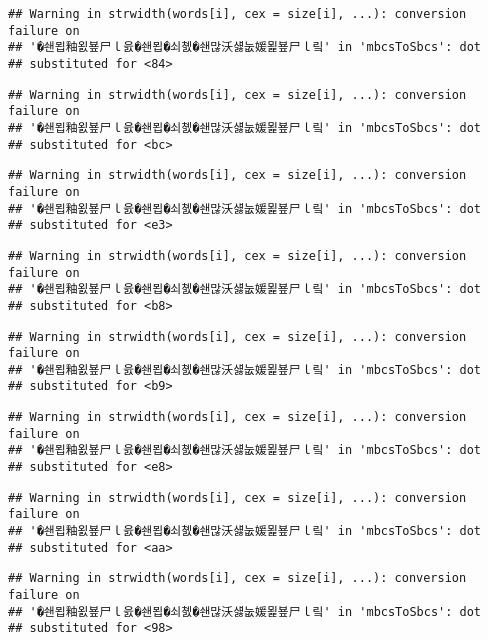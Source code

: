 \documentclass[]{article}
\begin{document}
\begin{verbatim}
## Warning in strwidth(words[i], cex = size[i], ...): conversion failure on
## '�쇈묍釉욄뵾尸ｌ읈�쇈묍�쇠쳸�쇈많沃섏눖媛묉뵾尸ｌ맄' in 'mbcsToSbcs': dot
## substituted for <84>
\end{verbatim}

\begin{verbatim}
## Warning in strwidth(words[i], cex = size[i], ...): conversion failure on
## '�쇈묍釉욄뵾尸ｌ읈�쇈묍�쇠쳸�쇈많沃섏눖媛묉뵾尸ｌ맄' in 'mbcsToSbcs': dot
## substituted for <bc>
\end{verbatim}

\begin{verbatim}
## Warning in strwidth(words[i], cex = size[i], ...): conversion failure on
## '�쇈묍釉욄뵾尸ｌ읈�쇈묍�쇠쳸�쇈많沃섏눖媛묉뵾尸ｌ맄' in 'mbcsToSbcs': dot
## substituted for <e3>
\end{verbatim}

\begin{verbatim}
## Warning in strwidth(words[i], cex = size[i], ...): conversion failure on
## '�쇈묍釉욄뵾尸ｌ읈�쇈묍�쇠쳸�쇈많沃섏눖媛묉뵾尸ｌ맄' in 'mbcsToSbcs': dot
## substituted for <b8>
\end{verbatim}

\begin{verbatim}
## Warning in strwidth(words[i], cex = size[i], ...): conversion failure on
## '�쇈묍釉욄뵾尸ｌ읈�쇈묍�쇠쳸�쇈많沃섏눖媛묉뵾尸ｌ맄' in 'mbcsToSbcs': dot
## substituted for <b9>
\end{verbatim}

\begin{verbatim}
## Warning in strwidth(words[i], cex = size[i], ...): conversion failure on
## '�쇈묍釉욄뵾尸ｌ읈�쇈묍�쇠쳸�쇈많沃섏눖媛묉뵾尸ｌ맄' in 'mbcsToSbcs': dot
## substituted for <e8>
\end{verbatim}

\begin{verbatim}
## Warning in strwidth(words[i], cex = size[i], ...): conversion failure on
## '�쇈묍釉욄뵾尸ｌ읈�쇈묍�쇠쳸�쇈많沃섏눖媛묉뵾尸ｌ맄' in 'mbcsToSbcs': dot
## substituted for <aa>
\end{verbatim}

\begin{verbatim}
## Warning in strwidth(words[i], cex = size[i], ...): conversion failure on
## '�쇈묍釉욄뵾尸ｌ읈�쇈묍�쇠쳸�쇈많沃섏눖媛묉뵾尸ｌ맄' in 'mbcsToSbcs': dot
## substituted for <98>
\end{verbatim}
\end{document}
